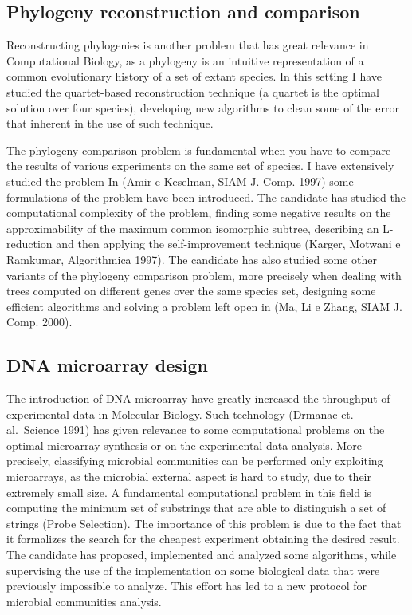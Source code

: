 \documentclass[11pt,a4paper,roman]{moderncv}
\begin{document}
\subsection{Phylogeny reconstruction and
comparison}\label{phylogeny-reconstruction-and-comparison}

Reconstructing phylogenies is another problem that has great relevance
in Computational Biology, as a phylogeny is an intuitive representation
of a common evolutionary history of a set of extant species. In this
setting I have studied the quartet-based reconstruction technique (a
quartet is the optimal solution over four species), developing new
algorithms to clean some of the error that inherent in the use of such
technique.

The phylogeny comparison problem is fundamental when you have to compare
the results of various experiments on the same set of species. I have
extensively studied the problem In (Amir e Keselman, SIAM J. Comp. 1997)
some formulations of the problem have been introduced. The candidate has
studied the computational complexity of the problem, finding some
negative results on the approximability of the maximum common isomorphic
subtree, describing an L-reduction and then applying the
self-improvement technique (Karger, Motwani e Ramkumar, Algorithmica
1997). The candidate has also studied some other variants of the
phylogeny comparison problem, more precisely when dealing with trees
computed on different genes over the same species set, designing some
efficient algorithms and solving a problem left open in (Ma, Li e Zhang,
SIAM J. Comp. 2000).

\subsection{DNA microarray design}\label{dna-microarray-design}

The introduction of DNA microarray have greatly increased the throughput
of experimental data in Molecular Biology. Such technology (Drmanac et.
al.~Science 1991) has given relevance to some computational problems on
the optimal microarray synthesis or on the experimental data analysis.
More precisely, classifying microbial communities can be performed only
exploiting microarrays, as the microbial external aspect is hard to
study, due to their extremely small size. A fundamental computational
problem in this field is computing the minimum set of substrings that
are able to distinguish a set of strings (Probe Selection). The
importance of this problem is due to the fact that it formalizes the
search for the cheapest experiment obtaining the desired result. The
candidate has proposed, implemented and analyzed some algorithms, while
supervising the use of the implementation on some biological data that
were previously impossible to analyze. This effort has led to a new
protocol for microbial communities analysis.
\end{document}
